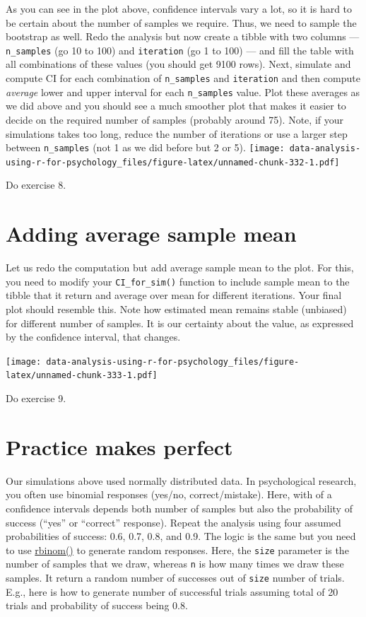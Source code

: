 \documentclass[
]{book}
\begin{document}
As you can see in the plot above, confidence intervals vary a lot, so it is hard to be certain about the number of samples we require. Thus, we need to sample the bootstrap as well. Redo the analysis but now create a tibble with two columns --- \texttt{n\_samples} (go 10 to 100) and \texttt{iteration} (go 1 to 100) --- and fill the table with all combinations of these values (you should get 9100 rows). Next, simulate and compute CI for each combination of \texttt{n\_samples} and \texttt{iteration} and then compute \emph{average} lower and upper interval for each \texttt{n\_samples} value. Plot these averages as we did above and you should see a much smoother plot that makes it easier to decide on the required number of samples (probably around 75). Note, if your simulations takes too long, reduce the number of iterations or use a larger step between \texttt{n\_samples} (not 1 as we did before but 2 or 5).
\texttt{[image: data-analysis-using-r-for-psychology\_files/figure-latex/unnamed-chunk-332-1.pdf]}

Do exercise 8.

\hypertarget{adding-average-sample-mean}{%
\section{Adding average sample mean}\label{adding-average-sample-mean}}

Let us redo the computation but add average sample mean to the plot. For this, you need to modify your \texttt{CI\_for\_sim()} function to include sample mean to the tibble that it return and average over mean for different iterations. Your final plot should resemble this. Note how estimated mean remains stable (unbiased) for different number of samples. It is our certainty about the value, as expressed by the confidence interval, that changes.

\texttt{[image: data-analysis-using-r-for-psychology\_files/figure-latex/unnamed-chunk-333-1.pdf]}

Do exercise 9.

\hypertarget{practice-makes-perfect}{%
\section{Practice makes perfect}\label{practice-makes-perfect}}

Our simulations above used normally distributed data. In psychological research, you often use binomial responses (yes/no, correct/mistake). Here, with of a confidence intervals depends both number of samples but also the probability of success (``yes'' or ``correct'' response). Repeat the analysis using four assumed probabilities of success: 0.6, 0.7, 0.8, and 0.9. The logic is the same but you need to use \href{https://stat.ethz.ch/R-manual/R-devel/library/stats/html/Binomial.html}{rbinom()} to generate random responses. Here, the \texttt{size} parameter is the number of samples that we draw, whereas \texttt{n} is how many times we draw these samples. It return a random number of successes out of \texttt{size} number of trials. E.g., here is how to generate number of successful trials assuming total of 20 trials and probability of success being 0.8.
\end{document}
